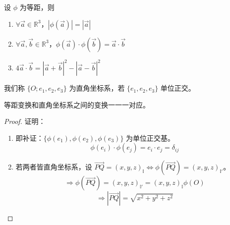 \documentclass[lang=cn,10pt,thmcnt=section]{elegantbook}
\begin{document}
        \begin{proposition}
        设 $\phi$ 为等距，则
        \begin{enumerate}
            \item $\forall \vec{a} \in \mathbb{R}^3$，$|\phi(\vec{a})| = |\vec{a}|$
            \item $\forall \vec{a}, \vec{b} \in \mathbb{R}^3$，$\phi(\vec{a}) \cdot \phi(\vec{b}) = \vec{a} \cdot \vec{b}$
            \item $4 \vec{a} \cdot \vec{b} = |\vec{a} + \vec{b}|^2 - |\vec{a} - \vec{b}|^2$
        \end{enumerate}
        \end{proposition}
    
        \begin{definition}[直角坐标系]
            我们称 $\{O; e_1, e_2, e_3\}$ 为直角坐标系，若 $\{e_1, e_2, e_3\}$ 单位正交。
            \end{definition}
            
            \begin{definition}[等距变换]
            等距变换和直角坐标系之间的变换一一一对应。
            \end{definition}
            
            \begin{proof}
            证明：
            \begin{enumerate}
                \item 即补证：$\{\phi(e_1), \phi(e_2), \phi(e_3)\}$ 为单位正交基。
                \begin{equation*}
                \phi(e_i) \cdot \phi(e_j) = e_i \cdot e_j = \delta_{ij}
                \end{equation*}
                \item 若两者皆直角坐标系，设 $\overrightarrow{PQ} = (x, y, z)_{\mathbb{I}} \Leftrightarrow \phi(\overrightarrow{PQ}) = (x, y, z)_{\mathbb{I}'}$。
                \begin{equation*}
                \Rightarrow \phi(\overrightarrow{PQ}) = (x, y, z)_{\mathbb{I}'} = (x, y, z)_{\mathbb{I}} \phi(O)
                \end{equation*}
                \begin{equation*}
                \Rightarrow |\overrightarrow{PQ}| = \sqrt{x^2 + y^2 + z^2}
                \end{equation*}
            \end{enumerate}
            \end{proof}
            
\end{document}
